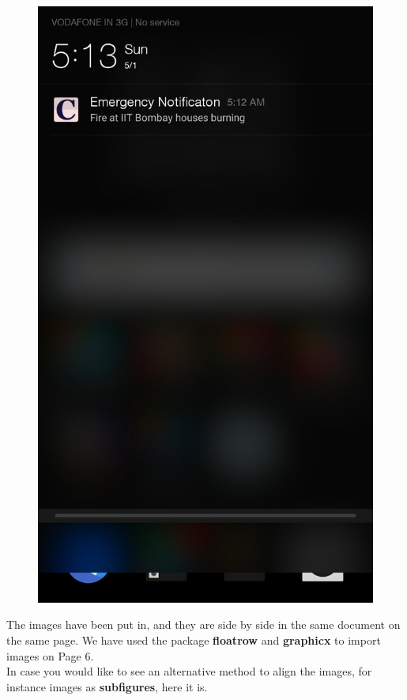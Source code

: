 \documentclass{article}
\begin{document}
\begin{figure}[H]
\begin{minipage}{.45\linewidth}
  \label{1}
\end{minipage}
\begin{minipage}{.45\linewidth}
  \includegraphics[width=0.95\linewidth ,height=1.6\linewidth]{2}
  \label{2}
\end{minipage}
\end{figure}
\large{The images have been put in, and they are side by side in the same document
on the same page. We have used the package {\bf floatrow} and {\bf graphicx} to import 
images on Page 6.\\
\hspace{1em} In case you would like to see an alternative method to align the images, for
instance images as {\bf subfigures}, here it is.}
\end{document}
